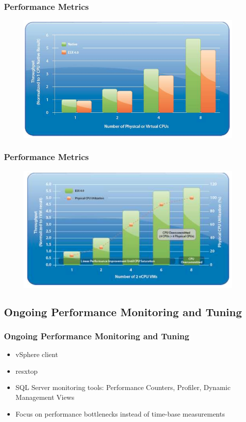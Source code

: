 \documentclass[CJK]{beamer}
\begin{document}
\begin{frame}
    \frametitle{Performance Metrics}
    \begin{figure}[b]
        \includegraphics[width=\textwidth]{"scale_up_performance_vs_native.png"}
    \end{figure}
\end{frame}

\begin{frame}
    \frametitle{Performance Metrics}
    \begin{figure}[b]
        \includegraphics[width=\textwidth]{"scale_out_consolidation_performance.png"}
    \end{figure}
\end{frame}

\subsection{Ongoing Performance Monitoring and Tuning}
\begin{frame}[t]
    \frametitle{Ongoing Performance Monitoring and Tuning}
    \begin{itemize}
        \item vSphere client
        \item resxtop
        \item SQL Server monitoring tools: Performance Counters, Profiler, Dynamic Management Views
        \item Focus on performance bottlenecks instead of time-base measurements
    \end{itemize}
\end{frame}
\end{document}
